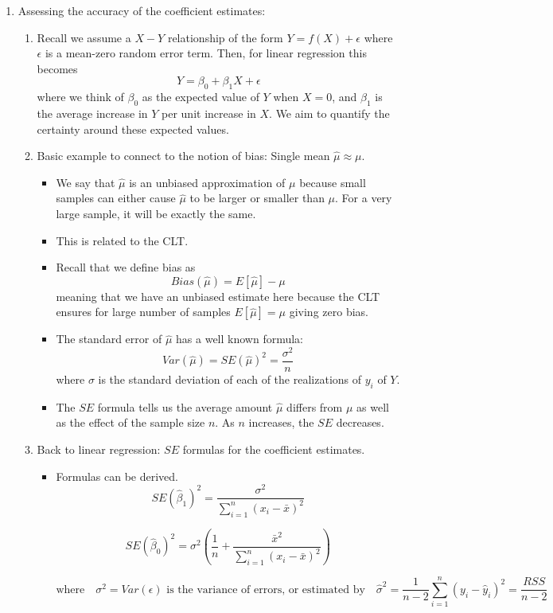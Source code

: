 \documentclass{article}
\begin{document}
\begin{enumerate}
\begin{enumerate}
\end{enumerate}

\item Assessing the accuracy of the coefficient estimates:
\begin{enumerate}
\item Recall we assume a $X-Y$ relationship of the form $Y=f(X) + \epsilon$ where $\epsilon$ is a mean-zero random error term. Then, for linear regression this becomes
\[
Y = \beta_0 + \beta_1 X + \epsilon
\]
where we think of $\beta_0$ as the expected value of $Y$ when $X=0$, and $\beta_1$ is the average increase in $Y$ per unit increase in $X$. We aim to quantify the certainty around these expected values.

\item Basic example to connect to the notion of bias: Single mean $\hat{\mu} \approx \mu$.
\begin{itemize}
\item We say that $\hat{\mu}$ is an unbiased approximation of $\mu$ because small samples can either cause $\hat{\mu}$ to be larger or smaller than $\mu$. For a very large sample, it will be exactly the same.
\item This is related to the CLT.
\item Recall that we define bias as 
\[
Bias(\hat{\mu}) = E[\hat{\mu}] - \mu
\]
meaning that we have an unbiased estimate here because the CLT ensures for large number of samples $E[\hat{\mu}]=\mu$ giving zero bias.
\item The standard error of $\hat{\mu}$ has a well known formula:
\[
Var(\hat{\mu}) = SE(\hat{\mu})^2 = \frac{\sigma^2}{n}
\]
where $\sigma$ is the standard deviation of each of the realizations of $y_i$ of $Y$. 
\item The $SE$ formula tells us the average amount $\hat{\mu}$ differs from $\mu$ as well as the effect of the sample size $n$. As $n$ increases, the $SE$ decreases. 
\end{itemize}

\item Back to linear regression: $SE$ formulas for the coefficient estimates.
\begin{itemize}
\item Formulas can be derived.
\[
SE(\hat{\beta}_1)^2 = \frac{\sigma^2}{\sum_{i=1}^n (x_i - \bar{x})^2}
\]

\[
SE(\hat{\beta}_0)^2 = \sigma^2 \left( \frac{1}{n} + \frac{\bar{x}^2}{\sum_{i=1}^n (x_i - \bar{x})^2} \right)
\]

\[
\text{where} \quad \sigma^2 = Var(\epsilon) \text{ is the variance of errors, or estimated by} \quad
\hat{\sigma}^2 = \frac{1}{n-2} \sum_{i=1}^n (y_i - \hat{y}_i)^2 = \frac{RSS}{n-2}
\]


\end{itemize}
\end{enumerate}
\end{enumerate}
\end{document}
